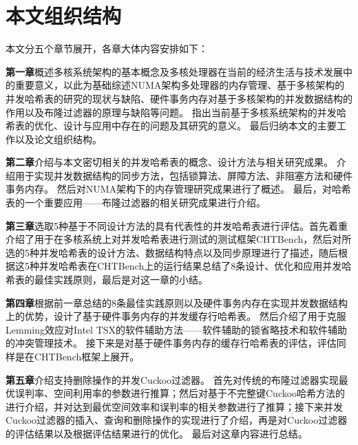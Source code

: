 \section{本文组织结构}
本文分五个章节展开，各章大体内容安排如下：

\textbf{第一章}概述多核系统架构的基本概念及多核处理器在当前的经济生活与技术发展中的重要意义，以此为基础综述NUMA架构多处理器的内存管理、基于多核架构的并发哈希表的研究的现状与缺陷、硬件事务内存对基于多核架构的并发数据结构的作用以及布隆过滤器的原理与缺陷等问题。
指出当前基于多核系统架构的并发哈希表的优化、设计与应用中存在的问题及其研究的意义。
最后归纳本文的主要工作以及论文组织结构。

\textbf{第二章}介绍与本文密切相关的并发哈希表的概念、设计方法与相关研究成果。
介绍用于实现并发数据结构的同步方法，包括锁算法、屏障方法、非阻塞方法和硬件事务内存。
然后对NUMA架构下的内存管理研究成果进行了概述。
最后，对哈希表的一个重要应用——布隆过滤器的相关研究成果进行介绍。

\textbf{第三章}选取5种基于不同设计方法的具有代表性的并发哈希表进行评估。首先着重介绍了用于在多核系统上对并发哈希表进行测试的测试框架CHTBench，然后对所选的5种并发哈希表的设计方法、数据结构特点以及同步原理进行了描述，随后根据这5种并发哈希表在CHTBench上的运行结果总结了8条设计、优化和应用并发哈希表的最佳实践原则，最后是对这一章的小结。

\textbf{第四章}根据前一章总结的8条最佳实践原则以及硬件事务内存在实现并发数据结构上的优势，设计了基于硬件事务内存的并发缓存行哈希表。
然后介绍了用于克服Lemming效应对Intel TSX的软件辅助方法——软件辅助的锁省略技术和软件辅助的冲突管理技术。
接下来是对基于硬件事务内存的缓存行哈希表的评估，评估同样是在CHTBench框架上展开。

\textbf{第五章}介绍支持删除操作的并发Cuckoo过滤器。
首先对传统的布隆过滤器实现最优误判率、空间利用率的参数进行推算；然后对基于不完整键Cuckoo哈希方法的进行介绍，并对达到最优空间效率和误判率的相关参数进行了推算；接下来并发Cuckoo过滤器的插入、查询和删除操作的实现进行了介绍，再是对Cuckoo过滤器的评估结果以及根据评估结果进行的优化。
最后对这章内容进行总结。

